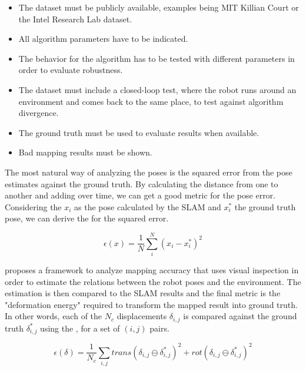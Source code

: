\begin{itemize}
    \item The dataset must be publicly available, examples being MIT Killian Court or the Intel Research Lab dataset.
    \item All algorithm parameters have to be indicated.
    \item The behavior for the algorithm has to be tested with different parameters in order to evaluate robustness.
    \item The dataset must include a closed-loop test, where the robot runs around an environment and comes back to the same place, to test against algorithm divergence.
    \item The ground truth must be used to evaluate results when available.
    \item Bad mapping results must be shown.
\end{itemize}

The most natural way of analyzing the poses is the squared error from the pose estimates against the ground truth. By calculating the distance from one to another and adding over time, we can get a good metric for the pose error. Considering the $x_i$ as the pose calculated by the SLAM and $x_i^*$ the ground truth pose, we can derive the  for the squared error.

\begin{equation}\label{eq:error_squared}
\epsilon(x) = \frac{1}{N} \sum_{i}^N (x_i - x_i^*)^2
\end{equation}

\citeauthor{kummerle2009measuring} proposes a framework to analyze mapping accuracy that uses visual inspection in order to estimate the relations between the robot poses and the environment. The estimation is then compared to the SLAM results and the final metric is the "deformation energy" required to transform the mapped result into ground truth. In other words, each of the $N_c$ displacements $\delta_{i,j}$ is compared against the ground truth $\delta_{i,j}^*$ using the , for a set of  $(i,j)$ pairs.

\begin{equation}\label{eq:displacement}
    \epsilon(\delta) = \frac{1}{N_c} \sum_{i, j} trans(\delta_{i,j} \ominus \delta_{i,j}^*)^2 + rot(\delta_{i,j} \ominus \delta_{i,j}^*)^2
\end{equation}

